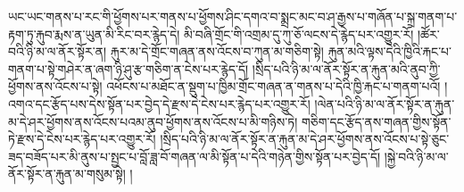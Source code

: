 ཡང་ཡང་གནས་པ་རང་གི་ཕྱོགས་པར་གནས་པ་ཕྱོགས་ཤིང་དགའ་བ་སྨྲང་མང་བ་ཤ་རྒྱས་པ་གཞོན་པ་སྐྲ་གནག་པ་རྟག་ཏུ་རྐུབ་རྨས་ན་ཡུན་མི་རིང་བར་རྙེད་དེ། མི་བཞི་གྲོང་གི་འགྲམ་དུ་ཀུ་ཅོ་ལངས་དེ་རྙེད་པར་འགྱུར་རོ། །ཚོར་བའི་ཉི་མ་ལ་ནོར་སྟོར་ན། རྐུར་མ་དེ་གྲོང་གཞན་ནས་འོངས་བ་ཀུན་མ་གཅིག་སྟེ། རྐུན་མའི་ལྟས་དེའི་ཁྱིའི་རྐང་པ་གནག་པ་སྟེ་གཤེར་ན་ཞག་ཉི་ཤུ་རྩ་གཅིག་ན་ངེས་པར་རྙེད་དོ། །སྲིད་པའི་ཉི་མ་ལ་ནོར་སྟོར་ན་རྐུན་མའི་ནུབ་ཀྱི་ཕྱོགས་ནས་འོངས་པ་སྟེ། འཕོངས་པ་མཐོང་ན་སྡུག་པ་ཁྱིམ་གྲོང་གཞན་ན་གནས་པ་དེའི་ཁྱི་རྐང་པ་གནག་པའོ། །འགའ་དང་རྩོད་པས་དེས་སྟོན་པར་བྱེད་དེ་རྫས་དེ་ངེས་པར་རྙེད་པར་འགྱུར་རོ། །ལེན་པའི་ཉི་མ་ལ་ནོར་སྟོར་ན་རྐུན་མ་དེ་ཤར་ཕྱོགས་ནས་འོངས་པའམ་ནུབ་ཕྱོགས་ནས་འོངས་པ་མི་གཉིས་ཏེ། གཅིག་དང་རྩོད་ནས་གཞན་གྱིས་སྟོན་ཏེ་རྫས་དེ་ངེས་པར་རྙེད་པར་འགྱུར་རོ། །སྲིད་པའི་ཉི་མ་ལ་ནོར་སྟོར་ན་རྐུན་མ་དེ་ཤར་ཕྱོགས་ནས་འོངས་པ་སྟེ་ཅུང་ཟད་བཟོད་པར་མི་ནུས་པ་སྤྱང་པ་བློ་ཟླ་བོ་གཞན་ལ་མི་སྟོན་པ་དེའི་གཉེན་གྱིས་སྟོན་པར་བྱེད་དོ། །སྐྱེ་བའི་ཉི་མ་ལ་ནོར་སྟོར་ན་རྐུན་མ་གསུམ་སྟེ། །

